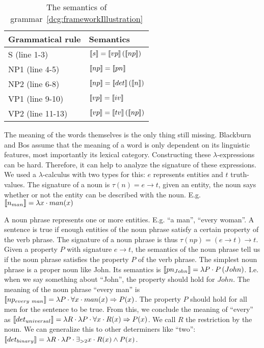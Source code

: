 \begin{table}[h]
  \begin{tabular}{@{}ll}
    \hline
    \textbf{Grammatical rule} & \textbf{Semantics} \\
    \hline
    S (line 1-3) & $\llbracket s \rrbracket = \llbracket vp \rrbracket \left( \llbracket np \rrbracket \right)$ \\
    NP1 (line 4-5) & $\llbracket np \rrbracket = \llbracket pn \rrbracket$ \\
    NP2 (line 6-8) & $\llbracket np \rrbracket = \llbracket det \rrbracket \left( \llbracket n \rrbracket \right)$ \\
    VP1 (line 9-10) & $\llbracket vp \rrbracket = \llbracket iv \rrbracket$ \\
    VP2 (line 11-13) & $\llbracket vp \rrbracket = \llbracket tv \rrbracket \left( \llbracket np \rrbracket \right)$\\
    \hline
  \end{tabular}
  \centering
  \caption{The semantics of grammar~\ref{dcg:frameworkIllustration}}
  \label{tbl:grammar-sem}
\end{table}

The meaning of the words themselves is the only thing still missing. Blackburn and Bos assume that the meaning of a word is only dependent on its linguistic features, most importantly its lexical category. Constructing these $\lambda$-expressions can be hard. Therefore, it can help to analyze the signature of these expressions. We used a $\lambda$-calculus with two types for this: $e$ represents entities and $t$ truth-values. The signature of a noun is $\tau(n) = e \rightarrow t$, given an entity, the noun says whether or not the entity can be described with the noun. E.g. $\llbracket n_{man} \rrbracket = \lambda x \cdot man(x)$

A noun phrase represents one or more entities. E.g. ``a man'', ``every woman''. A sentence is true if enough entities of the noun phrase satisfy a certain property of the verb phrase. The signature of a noun phrase is thus $\tau(np) = (e \rightarrow t) \rightarrow t$. Given a property $P$ with signature $e \rightarrow t$, the semantics of the noun phrase tell us if the noun phrase satisfies the property $P$ of the verb phrase. The simplest noun phrase is a proper noun like John. Its semantics is $\llbracket pn_{John} \rrbracket = \lambda P \cdot P \left( John \right)$. I.e. when we say something about ``John'', the property should hold for $John$. The meaning of the noun phrase ``every man'' is $\llbracket np_{every\ man} \rrbracket = \lambda P \cdot \forall x \cdot man(x) \Rightarrow P(x)$. The property $P$ should hold for all men for the sentence to be true. From this, we conclude the meaning of ``every'' as $\llbracket det_{universal} \rrbracket = \lambda R \cdot \lambda P \cdot \forall x \cdot R(x) \Rightarrow P(x)$. We call $R$ the restriction by the noun. We can generalize this to other determiners like ``two'': $\llbracket det_{binary} \rrbracket = \lambda R \cdot \lambda P \cdot \exists_{>2} x \cdot R(x) \land P(x)$.

